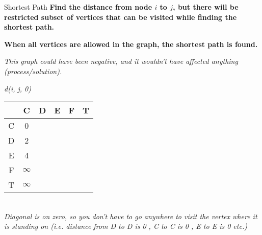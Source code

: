 \begin{frame}{Shortest Path}
\textbf{Find the distance from node $i$ to $j$, but there will be  restricted subset of vertices that can be visited while finding the shortest path.}

\vspace{1em}

\textbf{When all vertices are allowed in the graph, the shortest path is found.}
\vspace{1em}

\begin{center}
\end{center}

\vspace{1em}
\textit{This graph could have been negative, and it wouldn't have affected anything (process/solution).}
\end{frame}




\begin{frame}{\textit{d(i, j, 0)}}

\centering

\vspace{1em}

\begin{tabular}{c|ccccc}
     & C & D & E & F & T \\
    \hline
    C & 0  \\
    D & 2  \\
    E & 4  \\
    F & $\infty$  \\
    T & $\infty$  \\
\end{tabular}\\
\vspace{1em}
\vspace{1em}
\textit{Diagonal is on zero, so you don't have to go anywhere to visit the vertex where it is standing on (i.e. distance from D to D is 0 , C to C is 0 , E to E is 0 etc.)}
\vspace{1em}

\end{frame}

